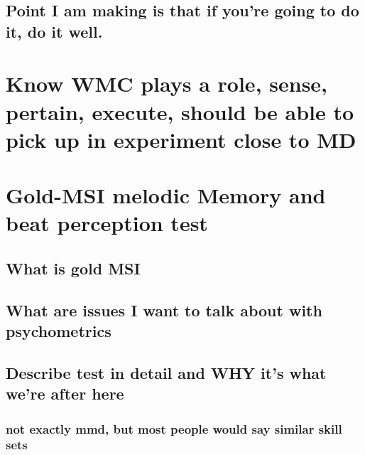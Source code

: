\documentclass[]{book}
\theoremstyle{definition}
\theoremstyle{definition}
\theoremstyle{definition}
\theoremstyle{remark}
\begin{document}
\hypertarget{point-i-am-making-is-that-if-youre-going-to-do-it-do-it-well.}{%
\subsection{Point I am making is that if you're going to do it, do it
well.}\label{point-i-am-making-is-that-if-youre-going-to-do-it-do-it-well.}}

\hypertarget{know-wmc-plays-a-role-sense-pertain-execute-should-be-able-to-pick-up-in-experiment-close-to-md}{%
\section{Know WMC plays a role, sense, pertain, execute, should be able
to pick up in experiment close to
MD}\label{know-wmc-plays-a-role-sense-pertain-execute-should-be-able-to-pick-up-in-experiment-close-to-md}}

\hypertarget{gold-msi-melodic-memory-and-beat-perception-test}{%
\section{Gold-MSI melodic Memory and beat perception
test}\label{gold-msi-melodic-memory-and-beat-perception-test}}

\hypertarget{what-is-gold-msi}{%
\subsection{What is gold MSI}\label{what-is-gold-msi}}

\hypertarget{what-are-issues-i-want-to-talk-about-with-psychometrics}{%
\subsection{What are issues I want to talk about with
psychometrics}\label{what-are-issues-i-want-to-talk-about-with-psychometrics}}

\hypertarget{describe-test-in-detail-and-why-its-what-were-after-here}{%
\subsection{Describe test in detail and WHY it's what we're after
here}\label{describe-test-in-detail-and-why-its-what-were-after-here}}

\hypertarget{not-exactly-mmd-but-most-people-would-say-similar-skill-sets}{%
\subsubsection{not exactly mmd, but most people would say similar skill
sets}\label{not-exactly-mmd-but-most-people-would-say-similar-skill-sets}}
\end{document}
